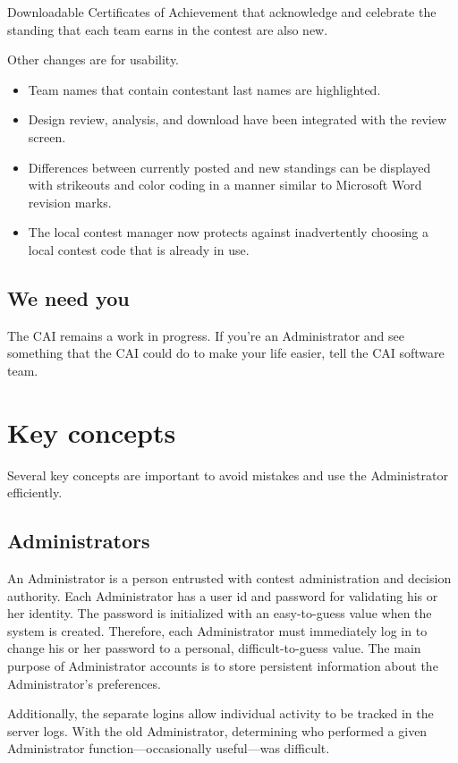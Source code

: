 \documentclass[11pt,letterpaper]{refart}
\begin{document}
Downloadable Certificates of Achievement that acknowledge and
celebrate the standing that each team earns in the contest are also
new.

Other changes are for usability. 
\begin{itemize}
\item Team names that contain contestant last names are highlighted.
\item Design review, analysis, and download have been integrated with the review screen. 
\item Differences between currently posted and new standings can be displayed with 
  strikeouts and color coding in a manner similar to Microsoft Word revision marks. 
\item The local contest manager now protects against inadvertently choosing a local 
  contest code that is already in use.
\end{itemize}

\subsection{We need you}
The CAI remains a work in progress. If you're an Administrator and see
something that the CAI could do to make your life easier, tell the CAI
software team.

\section{Key concepts}
Several key concepts are important to avoid mistakes and use the
Administrator efficiently.

\subsection{Administrators}
An Administrator is a person entrusted with contest administration and
decision authority.  Each Administrator has a user id and password for
validating his or her identity. The password is initialized with an
easy-to-guess value when the system is created. Therefore, each
Administrator must immediately log in to change his or her password to
a personal, difficult-to-guess value. The main purpose of
Administrator accounts is to store persistent information about the
Administrator's preferences.

Additionally, the separate logins allow individual activity to be
tracked in the server logs.  With the old Administrator, determining
who performed a given Administrator function---occasionally
useful---was difficult.
\end{document}
